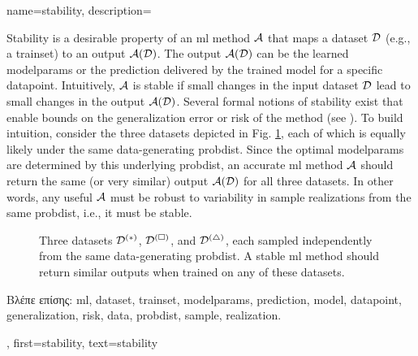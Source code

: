 {name={stability},
	description={Stability is a desirable property of an \gls{ml} method $\mathcal{A}$ that maps a 
		\gls{dataset} $\mathcal{D}$ (e.g., a \gls{trainset}) to an output $\mathcal{A}(\mathcal{D})$. The output 
		$\mathcal{A}(\mathcal{D})$ can be the learned \gls{modelparams} or the \gls{prediction} delivered 
		by the trained \gls{model} for a specific \gls{datapoint}. Intuitively, $\mathcal{A}$ is 
		stable if small changes in the input \gls{dataset} $\mathcal{D}$ lead to small changes in the 
		output $\mathcal{A}(\mathcal{D})$. Several formal notions of stability exist that enable bounds 
		on the \gls{generalization} error or \gls{risk} of the method (see \cite[Ch.~13]{ShalevMLBook}).
		To build intuition, consider the three \gls{dataset}s depicted in Fig. \ref{fig_three_data_stability_dict}, each 
		of which is equally likely under the same \gls{data}-generating \gls{probdist}. Since the 
		optimal \gls{modelparams} are determined by this underlying \gls{probdist}, an accurate 
		\gls{ml} method $\mathcal{A}$ should return the same (or very similar) output $\mathcal{A}(\mathcal{D})$ 
		for all three \gls{dataset}s. In other words, any useful $\mathcal{A}$ must be robust to 
		variability in \gls{sample} \gls{realization}s from the same \gls{probdist}, i.e., it must be stable. 
		\begin{figure}[H]
			\centering
			\caption{Three \gls{dataset}s $\mathcal{D}^{(*)}$, $\mathcal{D}^{(\square)}$, and $\mathcal{D}^{(\triangle)}$, 
				each sampled independently from the same \gls{data}-generating \gls{probdist}. A stable \gls{ml} 
				method should return similar outputs when trained on any of these \gls{dataset}s. \label{fig_three_data_stability_dict}}
		\end{figure}
		\foreignlanguage{greek}{Βλέπε επίσης:} \gls{ml}, \gls{dataset}, \gls{trainset}, \gls{modelparams}, \gls{prediction}, 
		\gls{model}, \gls{datapoint}, \gls{generalization}, \gls{risk}, \gls{data}, \gls{probdist}, \gls{sample}, \gls{realization}.}, 
	first={stability}, 
	text={stability} 
}


